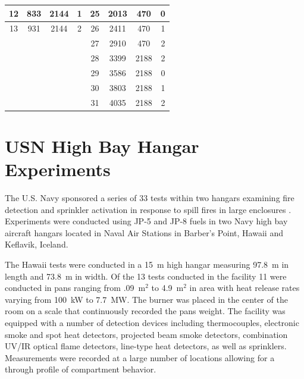 \begin{table}[h!]
\begin{center}
\begin{tabular}{|c|c|c|c||c|c|c|c|}
12      & 833       & 2144          & 1         & 25      & 2013      & 470           & 0                 \\ \hline
13      & 931       & 2144          & 2         & 26      & 2411      & 470           & 1                 \\ \hline
\multicolumn{4}{|r||}{}                         & 27      & 2910      & 470           & 2                 \\ \cline{5-8}
\multicolumn{4}{|r||}{}                         & 28      & 3399      & 2188          & 2                 \\ \cline{5-8}
\multicolumn{4}{|r||}{}                         & 29      & 3586      & 2188          & 0                 \\ \cline{5-8}
\multicolumn{4}{|r||}{}                         & 30      & 3803      & 2188          & 1                 \\ \cline{5-8}
\multicolumn{4}{|r||}{}                         & 31      & 4035      & 2188          & 2                 \\ \hline
\end{tabular}
\end{center}
\label{UL_NIST_Table}
\end{table}

\section{USN High Bay Hangar Experiments}

The U.S. Navy sponsored a series of 33 tests within two hangars examining fire detection and sprinkler activation in response to spill fires in large enclosures \cite{Gott:1997, Davis:2000}. Experiments were conducted using JP-5 and JP-8 fuels in two Navy high bay aircraft hangars located in Naval Air Stations in Barber's Point, Hawaii and Keflavik, Iceland.

The Hawaii tests were conducted in a 15~m high hangar measuring 97.8~m in length and 73.8~m in width. Of the 13 tests conducted in the facility 11 were conducted in pans ranging from .09~m$^2$ to 4.9~m$^2$ in area with heat release rates varying from 100~kW to 7.7~MW. The burner was placed in the center of the room on a scale that continuously recorded the pans weight. The facility was equipped with a number of detection devices including thermocouples, electronic smoke and spot heat detectors, projected beam smoke detectors, combination UV/IR optical flame detectors, line-type heat detectors, as well as sprinklers. Measurements were recorded at a large number of locations allowing for a through profile of compartment behavior.

